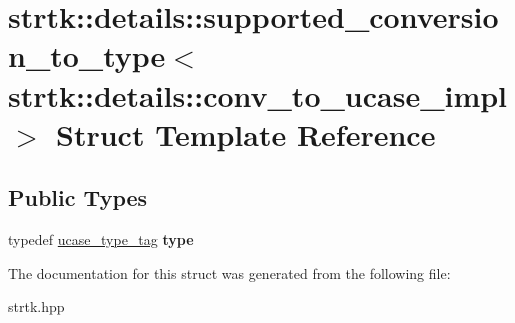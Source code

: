 \hypertarget{structstrtk_1_1details_1_1supported__conversion__to__type_3_01strtk_1_1details_1_1conv__to__ucase__impl_01_4}{\section{strtk\-:\-:details\-:\-:supported\-\_\-conversion\-\_\-to\-\_\-type$<$ strtk\-:\-:details\-:\-:conv\-\_\-to\-\_\-ucase\-\_\-impl $>$ Struct Template Reference}
\label{structstrtk_1_1details_1_1supported__conversion__to__type_3_01strtk_1_1details_1_1conv__to__ucase__impl_01_4}
}
\subsection*{Public Types}
\begin{DoxyCompactItemize}
\item 
\hypertarget{structstrtk_1_1details_1_1supported__conversion__to__type_3_01strtk_1_1details_1_1conv__to__ucase__impl_01_4_aa1d3d0383ca05f2f78cd017dd368aec9}{typedef \hyperlink{structstrtk_1_1details_1_1ucase__type__tag}{ucase\-\_\-type\-\_\-tag} {\bfseries type}}\label{structstrtk_1_1details_1_1supported__conversion__to__type_3_01strtk_1_1details_1_1conv__to__ucase__impl_01_4_aa1d3d0383ca05f2f78cd017dd368aec9}

\end{DoxyCompactItemize}


The documentation for this struct was generated from the following file\-:\begin{DoxyCompactItemize}
\item 
strtk.\-hpp\end{DoxyCompactItemize}
